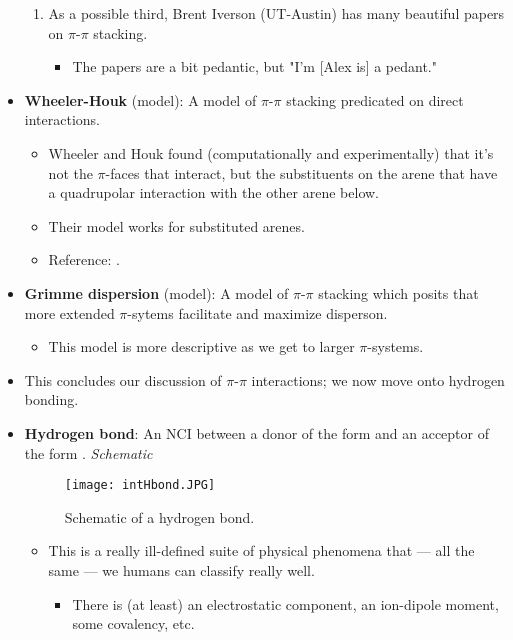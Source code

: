 \documentclass[../notes.tex]{subfiles}
\begin{document}
\begin{itemize}
\begin{enumerate}
        \item As a possible third, Brent Iverson (UT-Austin) has many beautiful papers on $\pi$-$\pi$ stacking.
        \begin{itemize}
            \item The papers are a bit pedantic, but "I'm [Alex is] a pedant."
        \end{itemize}
    \end{enumerate}
    \item \textbf{Wheeler-Houk} (model): A model of $\pi$-$\pi$ stacking predicated on direct interactions.
    \begin{itemize}
        \item Wheeler and Houk found (computationally and experimentally) that it's not the $\pi$-faces that interact, but the substituents on the arene that have a quadrupolar interaction with the other arene below.
        \item Their model works for substituted arenes.
        \item Reference: \textcite{bib:WheelerHouk}.
    \end{itemize}
    \item \textbf{Grimme dispersion} (model): A model of $\pi$-$\pi$ stacking which posits that more extended $\pi$-sytems facilitate and maximize disperson.
    \begin{itemize}
        \item This model is more descriptive as we get to larger $\pi$-systems.
    \end{itemize}
    \item This concludes our discussion of $\pi$-$\pi$ interactions; we now move onto hydrogen bonding.
    \item \textbf{Hydrogen bond}: An NCI between a donor of the form  and an acceptor of the form . \emph{Schematic}
    \begin{figure}[h!]
        \centering
        \texttt{[image: intHbond.JPG]}
        \caption{Schematic of a hydrogen bond.}
        \label{fig:intHbond}
    \end{figure}
    \begin{itemize}
        \item This is a really ill-defined suite of physical phenomena that --- all the same --- we humans can classify really well.
        \begin{itemize}
            \item There is (at least) an electrostatic component, an ion-dipole moment, some covalency, etc.

\end{itemize}
\end{itemize}
\end{itemize}
\end{document}

